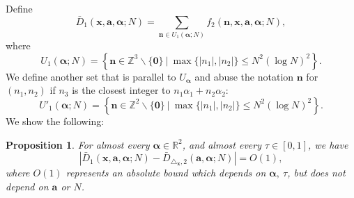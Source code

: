 \documentclass[11pt]{article}
\newtheorem{Prop}{Proposition}[section]
\newcommand{\beq}{\begin{equation}}
\newcommand{\eeq}{\end{equation}}
\renewcommand{\l}{\left}
\renewcommand{\r}{\right}
\newcommand{\Z}{\mathbb{Z}}
\newcommand{\R}{\mathbb{R}}
\renewcommand{\a}{\alpha}
\renewcommand{\(}{\left(}
\renewcommand{\)}{\right)}
\renewcommand{\bf}{\mathbf}
\newcommand{\n}{\bf{n}}
\newcommand{\bma}{\bm{\alpha}}
\newcommand{\Dbartwo}{\bar{D}_{\triangle_{\bf{x}},2} (\bm{a},\bm{\a};N)}
\newcommand{\ftwo}{f_2(\bf{n},\bf{x},\bm{a},\bm{\a};N)}
\newcommand{\<}{\langle}
\renewcommand{\>}{\rangle}
\begin{document}
Define
\beq
\bar{D}_1(\bf{x},\bm{a},\bm{\a};N)=\sum_{\bf{n}\in U_1(\bm{\a};N)}   \ftwo,
\eeq
where 
$$
U_1(\bm{\a};N)=\l\{\bf{n}\in \Z^3\backslash \{\bf{0}\} \ |\ 
 \max\{|n_1|,|n_2|\}\le N^2(\log N)^2
\r\}
.$$
We define another set that is parallel to $U_{\bma}$ and abuse the notation $\n$ for $(n_1,n_2)$ if $n_3$ is the closest integer to $n_1\a_1+n_2\a_2$:
$$
U'_1(\bm{\a};N)=\l\{\bf{n}\in \Z^2\backslash \{\bf{0}\} \ |\ 
 \max\{|n_1|,|n_2|\}\le N^2(\log N)^2
\r\}
.$$
We show the following:
\begin{Prop}\label{D_1 - D}
For almost every $\bma\in \R^2$, and almost every $\tau\in [0,1]$, we have
$$\l|\bar{D}_1(\bf{x},\bm{a},\bm{\a};N)-\Dbartwo \r|=O(1),$$
where $O(1)$ represents an absolute bound which depends on $\bma, \ \tau$, but does not depend on $\bm{a}$ or $N$.
\end{Prop}
\end{document}
